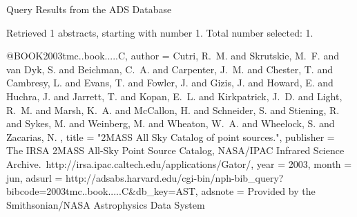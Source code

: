 Query Results from the ADS Database


Retrieved 1 abstracts, starting with number 1.  Total number selected: 1.

@BOOK{2003tmc..book.....C,
   author = {{Cutri}, R.~M. and {Skrutskie}, M.~F. and {van Dyk}, S. and 
	{Beichman}, C.~A. and {Carpenter}, J.~M. and {Chester}, T. and 
	{Cambresy}, L. and {Evans}, T. and {Fowler}, J. and {Gizis}, J. and 
	{Howard}, E. and {Huchra}, J. and {Jarrett}, T. and {Kopan}, E.~L. and 
	{Kirkpatrick}, J.~D. and {Light}, R.~M. and {Marsh}, K.~A. and 
	{McCallon}, H. and {Schneider}, S. and {Stiening}, R. and {Sykes}, M. and 
	{Weinberg}, M. and {Wheaton}, W.~A. and {Wheelock}, S. and {Zacarias}, N.
	},
    title = "{2MASS All Sky Catalog of point sources.}",
publisher = {The IRSA 2MASS All-Sky Point Source Catalog, NASA/IPAC Infrared Science Archive.~http://irsa.ipac.caltech.edu/applications/Gator/},
     year = 2003,
    month = jun,
   adsurl = {http://adsabs.harvard.edu/cgi-bin/nph-bib_query?bibcode=2003tmc..book.....C&db_key=AST},
  adsnote = {Provided by the Smithsonian/NASA Astrophysics Data System}
}


